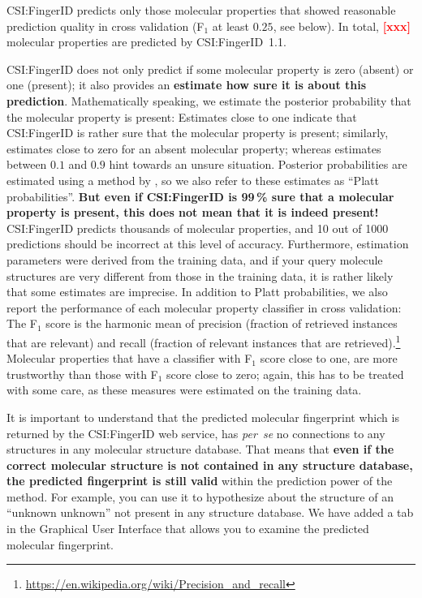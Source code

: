 \documentclass[letterpaper,10pt,openany,oneside]{sphinxmanual}
\newcommand{\todo}[1]{\xspace{\bfseries\sffamily\textcolor{red}{[#1]}}\xspace}
\begin{document}
CSI:FingerID predicts only those molecular properties that showed reasonable
prediction quality in cross validation (F$_1$ at least $0.25$, see below).
In total, \todo{xxx} molecular properties are predicted by CSI:FingerID~1.1.

CSI:FingerID does not only predict if some molecular property is zero
(absent) or one (present); it also provides an \textbf{estimate how sure it
is about this prediction}.  Mathematically speaking, we estimate the
posterior probability that the molecular property is present: Estimates close
to one indicate that CSI:FingerID is rather sure that the molecular property
is present; similarly, estimates close to zero for an absent molecular
property; whereas estimates between $0.1$ and $0.9$ hint towards an unsure
situation.  Posterior probabilities are estimated using a method
by \citet{platt00probabilistic}, so we also refer to these estimates as
``Platt probabilities''.  \textbf{But even if CSI:FingerID is 99\,\% sure
that a molecular property is present, this does not mean that it is indeed
present!}  CSI:FingerID predicts thousands of molecular properties, and 10
out of 1000 predictions should be incorrect at this level of accuracy.
Furthermore, estimation parameters were derived from the training data, and
if your query molecule structures are very different from those in the
training data, it is rather likely that some estimates are imprecise.  In
addition to Platt probabilities, we also report the performance of each
molecular property classifier in cross validation: The F$_1$ score is the
harmonic mean of precision (fraction of retrieved instances that are
relevant) and recall (fraction of relevant instances that are
retrieved).\footnote{\url{https://en.wikipedia.org/wiki/Precision_and_recall}}
Molecular properties that have a classifier with F$_1$ score close to one,
are more trustworthy than those with F$_1$ score close to zero; again, this
has to be treated with some care, as these measures were estimated on the
training data.

It is important to understand that the predicted molecular fingerprint which
is returned by the CSI:FingerID web service, has \emph{per~se} no connections
to any structures in any molecular structure database.  That means
that \textbf{even if the correct molecular structure is not contained in any
structure database, the predicted fingerprint is still valid} within the
prediction power of the method.  For example, you can use it to hypothesize
about the structure of an ``unknown unknown'' not present in any structure
database.  We have added a tab in the Graphical User Interface that allows
you to examine the predicted molecular fingerprint.
\end{document}
